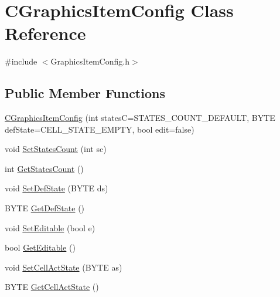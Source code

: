 \hypertarget{classCGraphicsItemConfig}{
\section{CGraphicsItemConfig Class Reference}
\label{classCGraphicsItemConfig}
}


{\ttfamily \#include $<$GraphicsItemConfig.h$>$}\subsection*{Public Member Functions}
\begin{DoxyCompactItemize}
\item 
\hyperlink{classCGraphicsItemConfig_a33b7af5ae08da16f731f51885fda91d3}{CGraphicsItemConfig} (int statesC=STATES\_\-COUNT\_\-DEFAULT, BYTE defState=CELL\_\-STATE\_\-EMPTY, bool edit=false)
\item 
void \hyperlink{classCGraphicsItemConfig_ae1a6fc47d35017d5ac76f328f323bce7}{SetStatesCount} (int sc)
\item 
int \hyperlink{classCGraphicsItemConfig_a63cb5e11443735539db0efe93090a5a5}{GetStatesCount} ()
\item 
void \hyperlink{classCGraphicsItemConfig_ace5b4e90b7f89113005c2b8340e40ddb}{SetDefState} (BYTE ds)
\item 
BYTE \hyperlink{classCGraphicsItemConfig_a3a7aac98e22bfdce17e0383a89913fbc}{GetDefState} ()
\item 
void \hyperlink{classCGraphicsItemConfig_a63436e6b3eb1e9ffe7ba7b43a9b89442}{SetEditable} (bool e)
\item 
bool \hyperlink{classCGraphicsItemConfig_a4948f7749819061051b596111969839a}{GetEditable} ()
\item 
void \hyperlink{classCGraphicsItemConfig_aa6207ae65027a39d7f6efefa665d4a30}{SetCellActState} (BYTE as)
\item 
BYTE \hyperlink{classCGraphicsItemConfig_abca82eef98adf65fe2511c1ad75faecd}{GetCellActState} ()
\end{DoxyCompactItemize}
